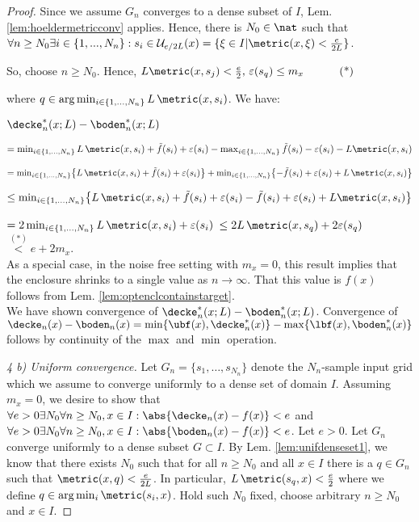 \begin{thm}
\begin{proof}
Since we assume $G_n$ converges to a dense subset of $I$, Lem. \ref{lem:hoeldermetricconv} applies. Hence, there is $N_0 \in \nat$ such that $\forall n \geq N_0 \exists i \in \{1,...,N_n\}: s_i \in \mathcal U_{e/2L}(x) = \{\xi \in I | \metric(x,\xi) < \frac{e}{2L}\}$.
 
So, choose $n \geq N_0$. 
Hence, $L \metric(x,s_j)  < \frac{e}{2}, \,\varepsilon(s_q) \leq m_x \hspace{1cm} \text{ (*)}$ 

where 
$q \in \arg\min_{i \in \{1,...,N_n\} } L \, \metric(x,s_i) $. 
We have:

 $\decke_n^*(x;L) - \boden_n^*(x;L)$ 

$= \min_{i \in \{1,...,N_n\} } L \, \metric(x,s_i) + \tilde f(s_i) + \varepsilon(s_i) - \max_{i \in \{1,...,N_n\} }  \tilde f(s_i) - \varepsilon(s_i) - L \metric(x,s_i) $

$= \min_{i \in \{1,...,N_n\} } \bigl\{L \, \metric(x,s_i) + \tilde f(s_i) + \varepsilon(s_i) \bigr\}+ \min_{i \in \{1,...,N_n\} }  \bigl\{-\tilde f(s_i) + \varepsilon(s_i)+ L \, \metric(x,s_i)\bigr\} $

$\leq \min_{i \in \{1,...,N_n\} } \bigl\{L \, \metric(x,s_i) + \tilde f(s_i) + \varepsilon(s_i)    -\tilde f(s_i) + \varepsilon(s_i)+ L \metric(x,s_i) \bigr\}$

$=2\min_{i \in \{1,...,N_n\} } L \, \metric(x,s_i) + \varepsilon(s_i) $
$\leq 2 L \, \metric(x,s_q)+ 2\varepsilon(s_q) $
$\stackrel{(*)}{<} e + 2 m_x  $.\\
As a special case, in the noise free setting with  $m_x=0$, this result implies that the enclosure shrinks to a single value as $n \to \infty$. That this value is $f(x)$ follows from Lem. \ref{lem:optenclcontainstarget}.  \\

We have shown convergence of $\decke_n^*(x;L) - \boden_n^*(x;L)$. Convergence of $\decke_n(x) - \boden_n(x) = \min\{\ubf(x), \decke_n^*(x)\} - \max\{\lbf(x),\boden_n^*(x)\}$ follows by continuity of the $\max$ and $\min$ operation.


 \textit{4 b) Uniform convergence.}
Let $G_n = \{s_1,\ldots,s_{N_n}\}$ denote the $N_n$-sample input grid which we assume to converge uniformly to a dense set of domain $I$. 
Assuming $m_x =0$, we desire to show that $\forall e >0 \exists N_0 \forall n \geq N_0 , x \in I : \abs{ \decke_n(x) - f(x)} < e $ and $\forall e >0 \exists N_0 \forall n \geq N_0 , x \in I : \abs{ \boden_n(x) - f(x)} < e $.
Let $e > 0$.
Let $G_n$ converge uniformly to a dense subset  $G \subset I$. By Lem. \ref{lem:unifdenseset1}, we know that 
there exists $N_0$ such that for all $n \geq N_0$ and all $x \in I$ there is a $q \in G_n$ such that $\metric(x,q) < \frac{e}{2  L}$. 
In particular, $ L \, \metric(s_q ,x ) < \frac{e}{2}$ where we define $q \in \arg\min_{i} \metric(s_i ,x )$. 
Hold such $N_0$ fixed, choose arbitrary $n \geq N_0$ and $x \in I$. 


\end{proof}
\end{thm}
